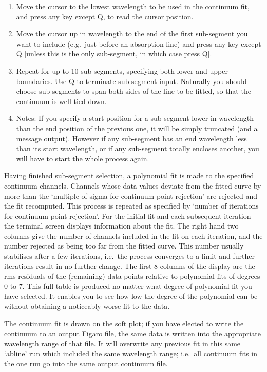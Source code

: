 \begin{enumerate}
\item
   Move the cursor to the lowest wavelength to be used in the continuum
   fit, and press any key except Q, to read the cursor position.
\item
   Move the cursor up in wavelength to the end of the first sub-segment
   you want to include (e.g.\ just before an absorption line) and press
   any key except Q [unless this is the only sub-segment, in which case
   press Q].
\item
   Repeat for up to 10 sub-segments, specifying both lower and upper
   boundaries. Use Q to terminate sub-segment input.  Naturally you
   should choose sub-segments to span both sides of the line to be
   fitted, so that the continuum is well tied down.
\item
   Notes: If you specify a start position for a sub-segment lower in
   wavelength than the end position of the previous one, it will be
   simply truncated (and a message output). However if any sub-segment
   has an end wavelength less than its start wavelength, or if any
   sub-segment totally encloses another, you will have to start the whole
   process again.
\end{enumerate}

   Having finished sub-segment selection, a polynomial fit is made to
   the specified continuum channels. Channels whose data values deviate
   from the fitted curve by more than the `multiple of sigma for
   continuum point rejection' are rejected and the fit recomputed. This
   process is repeated as specified by `number of iterations for
   continuum point rejection'. For the initial fit and each subsequent
   iteration the terminal screen displays information about the fit. The
   right hand two columns give the number of channels included in the
   fit on each iteration, and the number rejected as being too far from
   the fitted curve. This number usually stabilises after a few
   iterations, i.e.\ the process converges to a limit and further
   iterations result in no further change. The first 8 columns of the
   display are the rms residuals of the (remaining) data points relative
   to polynomial fits of degrees 0 to 7. This full table is produced no
   matter what degree of polynomial fit you have selected. It enables
   you to see how low the degree of the polynomial can be without
   obtaining a noticeably worse fit to the data.

   The continuum fit is drawn on the soft plot; if you have elected to
   write the continuum to an output Figaro file, the same data is
   written into the appropriate wavelength range of that file. It will
   overwrite any previous fit in this same `abline' run which included
   the same wavelength range; i.e.\ all continuum fits in the one run go
   into the same output continuum file.

